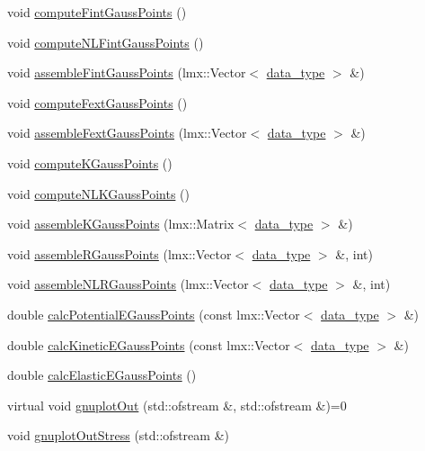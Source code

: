 \begin{DoxyCompactItemize}
\item 
void \hyperlink{classmknix_1_1_cell_a1c3123f613acd57332a6e84dc3736b86}{compute\-Fint\-Gauss\-Points} ()
\item 
void \hyperlink{classmknix_1_1_cell_a84014b9ed9c8a49c604f4ddb91b524fe}{compute\-N\-L\-Fint\-Gauss\-Points} ()
\item 
void \hyperlink{classmknix_1_1_cell_a1bf285b7dd7f06ece2f92e2b4389d6f5}{assemble\-Fint\-Gauss\-Points} (lmx\-::\-Vector$<$ \hyperlink{namespacemknix_a16be4b246fbf2cceb141e3a179111020}{data\-\_\-type} $>$ \&)
\item 
void \hyperlink{classmknix_1_1_cell_a19b4ed719612fe2e0043d0cebcbe1537}{compute\-Fext\-Gauss\-Points} ()
\item 
void \hyperlink{classmknix_1_1_cell_a7c381e6cbcdb2478505645cad57a2c6e}{assemble\-Fext\-Gauss\-Points} (lmx\-::\-Vector$<$ \hyperlink{namespacemknix_a16be4b246fbf2cceb141e3a179111020}{data\-\_\-type} $>$ \&)
\item 
void \hyperlink{classmknix_1_1_cell_a379600644881412c03608d3d32c36d49}{compute\-K\-Gauss\-Points} ()
\item 
void \hyperlink{classmknix_1_1_cell_a56231c1df8cd13f6b3f04356da6c2955}{compute\-N\-L\-K\-Gauss\-Points} ()
\item 
void \hyperlink{classmknix_1_1_cell_a8b703b97535562245382523c3702a054}{assemble\-K\-Gauss\-Points} (lmx\-::\-Matrix$<$ \hyperlink{namespacemknix_a16be4b246fbf2cceb141e3a179111020}{data\-\_\-type} $>$ \&)
\item 
void \hyperlink{classmknix_1_1_cell_a97fdd8bbf158f3b03b1af601177c2585}{assemble\-R\-Gauss\-Points} (lmx\-::\-Vector$<$ \hyperlink{namespacemknix_a16be4b246fbf2cceb141e3a179111020}{data\-\_\-type} $>$ \&, int)
\item 
void \hyperlink{classmknix_1_1_cell_af65d528a607f3215d04449551db94dcd}{assemble\-N\-L\-R\-Gauss\-Points} (lmx\-::\-Vector$<$ \hyperlink{namespacemknix_a16be4b246fbf2cceb141e3a179111020}{data\-\_\-type} $>$ \&, int)
\item 
double \hyperlink{classmknix_1_1_cell_a9aba982ff2a54738ec8b38446d333f8d}{calc\-Potential\-E\-Gauss\-Points} (const lmx\-::\-Vector$<$ \hyperlink{namespacemknix_a16be4b246fbf2cceb141e3a179111020}{data\-\_\-type} $>$ \&)
\item 
double \hyperlink{classmknix_1_1_cell_aa0b40b9534a376333490fe73d921e552}{calc\-Kinetic\-E\-Gauss\-Points} (const lmx\-::\-Vector$<$ \hyperlink{namespacemknix_a16be4b246fbf2cceb141e3a179111020}{data\-\_\-type} $>$ \&)
\item 
double \hyperlink{classmknix_1_1_cell_a1b59c56aa8983a27571c6809b03604c5}{calc\-Elastic\-E\-Gauss\-Points} ()
\item 
virtual void \hyperlink{classmknix_1_1_cell_a345a938d058d10f60d6c302a715290de}{gnuplot\-Out} (std\-::ofstream \&, std\-::ofstream \&)=0
\item 
void \hyperlink{classmknix_1_1_cell_a6dd6795d452d5bd8ff26de1419baef31}{gnuplot\-Out\-Stress} (std\-::ofstream \&)
\end{DoxyCompactItemize}
